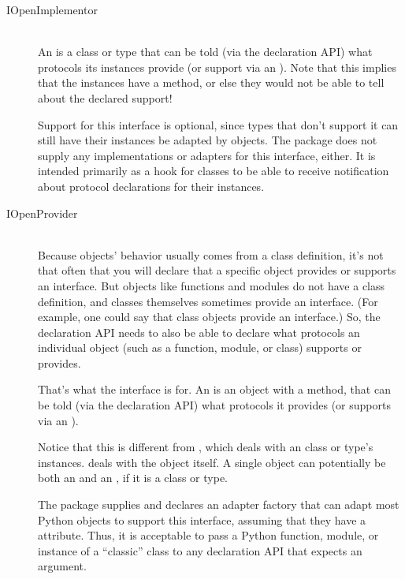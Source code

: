 \begin{verbatim%
}
\begin{verbatim%
}
\begin{verbatim%
}
\begin{verbatim%
}
\begin{description}
\item[IOpenImplementor] \hfill \\
An  is a class or type that can be told (via the
declaration API) what protocols its instances provide (or support via an
).  Note that this implies that the instances have
a  method, or else they would not be able to tell
 about the declared support!

Support for this interface is optional, since types that don't support it
can still have their instances be adapted by  objects.
The  package does not supply any implementations or adapters
for this interface, either.  It is intended primarily as a hook for classes
to be able to receive notification about protocol declarations for their
instances.




\item[IOpenProvider] \hfill \\
Because objects' behavior usually comes from a class definition, it's not that
often that you will declare that a specific object provides or supports an
interface.  But objects like functions and modules do not have a class
definition, and classes themselves sometimes provide an interface.  (For
example, one could say that class objects provide an  interface.)
So, the declaration API needs to also be able to declare what protocols an
individual object (such as a function, module, or class) supports or provides.

That's what the  interface is for.  An
 is an object with a  method, that can
be told (via the declaration API) what protocols it provides (or supports via
an ).

Notice that this is different from , which deals with
an class or type's instances.   deals with the object
itself.  A single object can potentially be both an  and an
, if it is a class or type.

The  package supplies and declares an adapter factory that
can adapt most Python objects to support this interface, assuming that they
have a  attribute.  Thus, it is acceptable to pass a Python
function, module, or instance of a  ``classic'' class to any declaration API
that expects an  argument.


\end{description}
\end{verbatim%
}
\end{verbatim%
}
\end{verbatim%
}
\end{verbatim%
}
